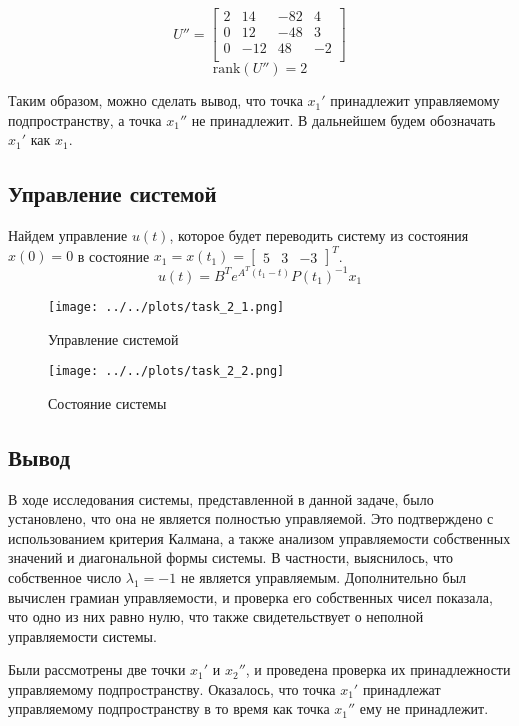 \begin{equation}
   U'' = \begin{bmatrix}
        2 & 14 & -82 & 4\\ 
        0 & 12 & -48 & 3\\ 
        0 & -12 & 48 & -2\\
    \end{bmatrix}
\end{equation}
\begin{equation}
    \text{rank}(U'') = 2
\end{equation}

Таким образом, можно сделать вывод, что точка $x_1'$ принадлежит управляемому подпространству, а точка $x_1''$ не принадлежит. В дальнейшем будем обозначать $x_1'$ как $x_1$.

\subsection{Управление системой}
Найдем управление $u(t)$, которое будет переводить систему из состояния $x(0) = 0$ в состояние $x_1 = x(t_1) = \begin{bmatrix} 5 & 3 & -3 \end{bmatrix}^T$. 
\begin{equation}
    u(t) = B^Te^{A^T(t_1 - t)}P(t_1)^{-1}x_1
\end{equation}

\begin{figure}[H]
    \centering
    \texttt{[image: ../../plots/task\_2\_1.png]}
    \caption{Управление системой}
    \label{fig:task2_control_signal}
\end{figure}

\begin{figure}[H]
    \centering
    \texttt{[image: ../../plots/task\_2\_2.png]}
    \caption{Состояние системы}
    \label{fig:task2_state}
\end{figure}

\subsection{Вывод}
В ходе исследования системы, представленной в данной задаче, было установлено, 
что она не является полностью управляемой. 
Это подтверждено с использованием критерия Калмана, 
а также анализом управляемости собственных значений и диагональной формы системы. 
В частности, выяснилось, что собственное число $\lambda_1 = -1$ не является 
управляемым. Дополнительно был вычислен грамиан управляемости, 
и проверка его собственных чисел показала, что одно из них равно нулю, 
что также свидетельствует о неполной управляемости системы.

Были рассмотрены две точки $x_1'$ и $x_2''$, и проведена проверка их принадлежности 
управляемому подпространству. Оказалось, что точка $x_1'$ принадлежат управляемому подпространству
в то время как точка $x_1''$ ему не принадлежит. 